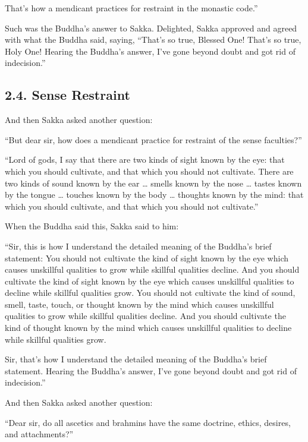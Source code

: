 \documentclass[12pt,openany]{book}%
\begin{document}
That’s how a mendicant practices for restraint in the monastic code.” 

Such was the Buddha’s answer to Sakka. Delighted, Sakka approved and agreed with what the Buddha said, saying, “That’s so true, Blessed One! That’s so true, Holy One! Hearing the Buddha’s answer, I’ve gone beyond doubt and got rid of indecision.” 

\subsection*{2.4. Sense Restraint }

And then Sakka asked another question: 

“But dear sir, how does a mendicant practice for restraint of the sense faculties?” 

“Lord of gods, I say that there are two kinds of sight known by the eye: that which you should cultivate, and that which you should not cultivate. There are two kinds of sound known by the ear … smells known by the nose … tastes known by the tongue … touches known by the body … thoughts known by the mind: that which you should cultivate, and that which you should not cultivate.” 

When the Buddha said this, Sakka said to him: 

“Sir, this is how I understand the detailed meaning of the Buddha’s brief statement: You should not cultivate the kind of sight known by the eye which causes unskillful qualities to grow while skillful qualities decline. And you should cultivate the kind of sight known by the eye which causes unskillful qualities to decline while skillful qualities grow. You should not cultivate the kind of sound, smell, taste, touch, or thought known by the mind which causes unskillful qualities to grow while skillful qualities decline. And you should cultivate the kind of thought known by the mind which causes unskillful qualities to decline while skillful qualities grow. 

Sir, that’s how I understand the detailed meaning of the Buddha’s brief statement. Hearing the Buddha’s answer, I’ve gone beyond doubt and got rid of indecision.” 

And then Sakka asked another question: 

“Dear sir, do all ascetics and brahmins have the same doctrine, ethics, desires, and attachments?” 
\end{document}
